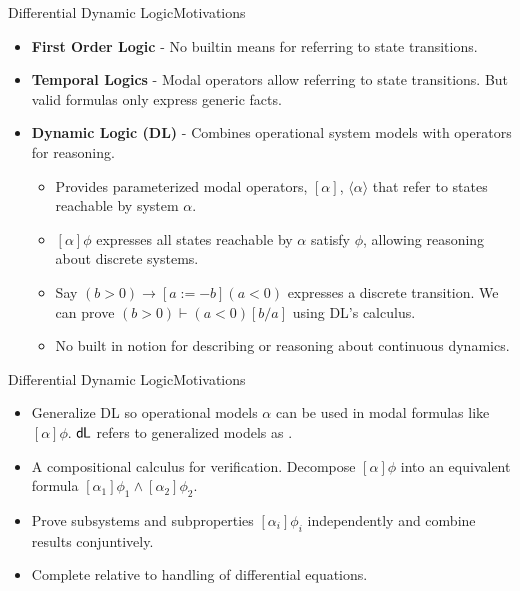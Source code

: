 \documentclass{beamer}
\newcommand{\dL}{\text{\upshape\textsf{d{\kern-0.05em}L}}}
\begin{document}
\begin{frame}{Differential Dynamic Logic}{Motivations}
  \begin{itemize}
    \item \textbf{First Order Logic} - No builtin means for referring to state
      transitions.
    \item \textbf{Temporal Logics} - Modal operators allow referring to state transitions.
      But valid formulas only express generic facts.
      \pause
    \item \textbf{Dynamic Logic (DL)} - Combines operational system models with
      operators for reasoning.
      \begin{itemize}
        \item Provides parameterized modal operators, $[\alpha]$,
          $\langle\alpha\rangle$
          that refer to states reachable by system $\alpha$.
        \item $[\alpha]\phi$ expresses all states reachable by $\alpha$ satisfy
          $\phi$, allowing reasoning about discrete systems.
        \item Say $(b > 0) \to [a := -b] (a < 0) $ expresses a
          discrete transition. We can prove $(b > 0) \vdash (a < 0) [ b / a ]$
          using DL's calculus.
        \item No built in notion for describing or reasoning about continuous dynamics.
      \end{itemize}
  \end{itemize}
\end{frame}

\begin{frame}{Differential Dynamic Logic}{Motivations}
  \begin{itemize}
    \item Generalize DL so operational models $\alpha$ can be
      used in modal formulas like $[\alpha]\phi$. $\dL$ refers to
      generalized models as .
    \item A compositional calculus for verification. Decompose
      $[\alpha]\phi$ into an equivalent formula $[\alpha_1]\phi_1 \wedge
      [\alpha_2]\phi_2$.
    \item Prove subsystems and subproperties $[\alpha_i]\phi_i$ independently
      and combine results conjuntively.
    \item Complete relative to handling of differential equations.
  \end{itemize}
\end{frame}
\end{document}

